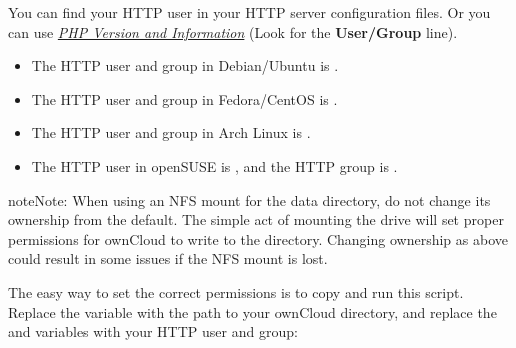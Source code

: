 \documentclass[letterpaper,10pt,english]{sphinxmanual}
\begin{document}
You can find your HTTP user in your HTTP server configuration files. Or you can
use {\hyperref[issues/general_troubleshooting:label\string-phpinfo]{\emph{PHP Version and Information}}} (Look for the \textbf{User/Group} line).
\begin{itemize}
\item {} 
The HTTP user and group in Debian/Ubuntu is .

\item {} 
The HTTP user and group in Fedora/CentOS is .

\item {} 
The HTTP user and group in Arch Linux is .

\item {} 
The HTTP user in openSUSE is , and the HTTP group is .

\end{itemize}

\begin{notice}{note}{Note:}
When using an NFS mount for the data directory, do not change its
ownership from the default. The simple act of mounting the drive will set
proper permissions for ownCloud to write to the directory. Changing
ownership as above could result in some issues if the NFS mount is
lost.
\end{notice}

The easy way to set the correct permissions is to copy and run this script.
Replace the  variable with the path to your ownCloud directory, and
replace the  and  variables with your HTTP user and group:
\end{document}
